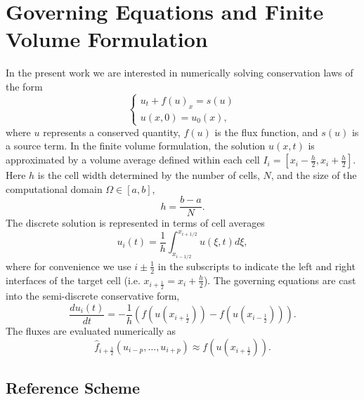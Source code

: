 \documentclass{article}
\begin{document}
\section{Governing Equations and Finite Volume Formulation}

    In the present work we are interested in numerically solving conservation
    laws of the form
    \begin{equation}
    \begin{cases}
      u_{t} + f(u)_{x} = s(u) \\    
      u(x,0) = u_{0}(x),
    \end{cases}
    \end{equation}
    where $u$ represents a conserved quantity, $f(u)$ is the flux function, and
    $s(u)$ is a source term. In the finite volume formulation, the solution
    $u(x,t)$ is approximated by a volume average defined within each cell $I_{i}
    = \left[ x_{i}-\frac{h}{2}, x_{i}+\frac{h}{2} \right]$. Here $h$ is the cell
    width determined by the number of cells, $N$, and the size of the
    computational domain
    $\Omega \in \left[a,b\right]$,
    \begin{equation}
        h = \frac{b-a}{N}.
    \end{equation}
    The discrete solution is represented in terms of cell averages
    \begin{equation}
        u_{i}(t) = \frac{1}{h} \int_{x_{i-1/2}}^{x_{i+1/2}} u(\xi,t) d \xi,
    \end{equation}
    where for convenience we use $i \pm \frac{1}{2}$ in the subscripts to
    indicate the left and right interfaces of the target cell (i.e.
    $x_{i+\frac{1}{2}} =
    x_{i} + \frac{h}{2}$).  The governing equations are cast into the
    semi-discrete conservative form,
    \begin{equation}
        \frac{du_{i}(t)}{dt} = -\frac{1}{h} \left( f(u(x_{i+\frac{1}{2}})) -
        f(u(x_{i-\frac{1}{2}})) \right).
    \end{equation}
    The fluxes are evaluated numerically as
    \begin{equation}
       \hat{f}_{i + \frac{1}{2}}(u_{i-p}, \dots, u_{i+p}) \approx
        f(u(x_{i+\frac{1}{2}})).
    \end{equation}

    \subsection*{Reference Scheme}
\end{document}
